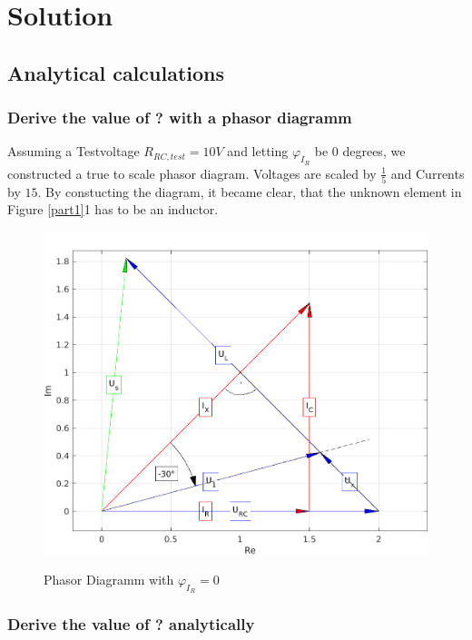 \documentclass[a4paper]{article}
\begin{document}
\section{Solution}
\subsection{Analytical calculations}
\subsubsection{Derive the value of ? with a phasor diagramm}
Assuming a Testvoltage $R_{RC, test} = 10V$ and letting $\varphi_{I_{R}}$ be $0$ degrees, we
constructed a true to scale phasor diagram. Voltages are scaled by  $\frac{1}{5}$ and Currents by
$15$. By constucting the diagram, it became clear, that the unknown element in Figure \ref{part1}1
has to be an inductor.

\begin{figure}[ht!]
	\centering
	\includegraphics[scale=0.8]{./Figures/phasors_1.png}
	\label{phasor_dia_1}
	\caption{Phasor Diagramm with $\varphi_{I_{R}} = 0$}
\end{figure}

\clearpage
\subsubsection{Derive the value of ? analytically}
\end{document}
